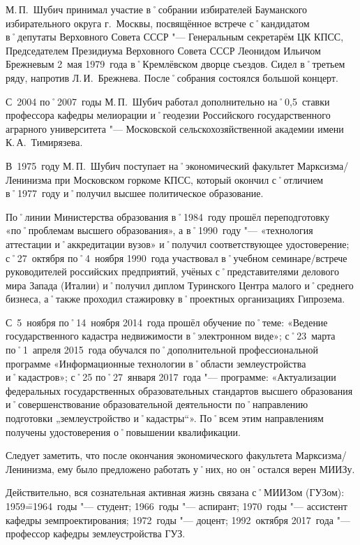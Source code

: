 М.\,П.~Шубич принимал участие в˚собрании избирателей Бауманского избирательного округа г.~Москвы, посвящённое встрече с˚кандидатом в˚депутаты Верховного Совета СССР "--- Генеральным секретарём ЦК КПСС, Председателем Президиума Верховного Совета СССР Леонидом Ильичом Брежневым 2~мая 1979~года в˚Кремлёвском дворце съездов. Сидел в˚третьем ряду, напротив Л.\,И.~Брежнева. После˚собрания состоялся большой концерт. 

С~2004 по˚2007~годы М.\,П.~Шубич работал дополнительно на˚0,5~ставки профессора кафедры мелиорации и˚геодезии Российского государственного аграрного университета "--- Московской сельскохозяйственной академии имени К.\,А.~Тимирязева.

В~1975~году М.\,П.~Шубич поступает на˚экономический факультет Марксизма\-/Ленинизма при Московском горкоме КПСС, который окончил с˚отличием в˚1977~году и˚получил высшее политическое образование.

По˚линии Министерства образования в˚1984~году прошёл переподготовку «по˚проблемам высшего образования», а в˚1990~году "--- «технология аттестации и˚аккредитации вузов» и˚получил соответствующее удостоверение; с˚27~октября по˚4~ноября 1990~года участвовал в˚учебном семинаре\-/встрече руководителей российских предприятий, учёных с˚представителями делового мира Запада (Италии) и˚получил диплом Туринского Центра малого и˚среднего бизнеса, а˚также проходил стажировку в˚проектных организациях Гипрозема.

С~5~ноября по˚14~ноября 2014~года прошёл обучение по˚теме: «Ведение государственного кадастра недвижимости в˚электронном виде»; с˚23~марта по˚1~апреля 2015~года обучался по˚дополнительной профессиональной программе «Информационные технологии в˚области землеустройства и˚кадастров»; с˚25 по˚27~января 2017~года "--- программе: «Актуализации федеральных государственных образовательных стандартов высшего образования и˚совершенствование образовательной деятельности по˚направлению подготовки „землеустройство и˚кадастры“». По˚всем этим направлениям получены удостоверения о˚повышении квалификации. 

Следует заметить, что после окончания экономического факультета Марксизма\-/Ленинизма, ему было предложено работать у˚них, но он˚остался верен МИИЗу.

Действительно, вся сознательная активная жизнь связана с˚МИИЗом (ГУЗом): 1959\==1964~годы "--- студент; 1966~годы "--- аспирант; 1970~годы "--- ассистент кафедры земпроектирования; 1972~годы "--- доцент; 1992~октября 2017~года "--- профессор кафедры землеустройства ГУЗ.

